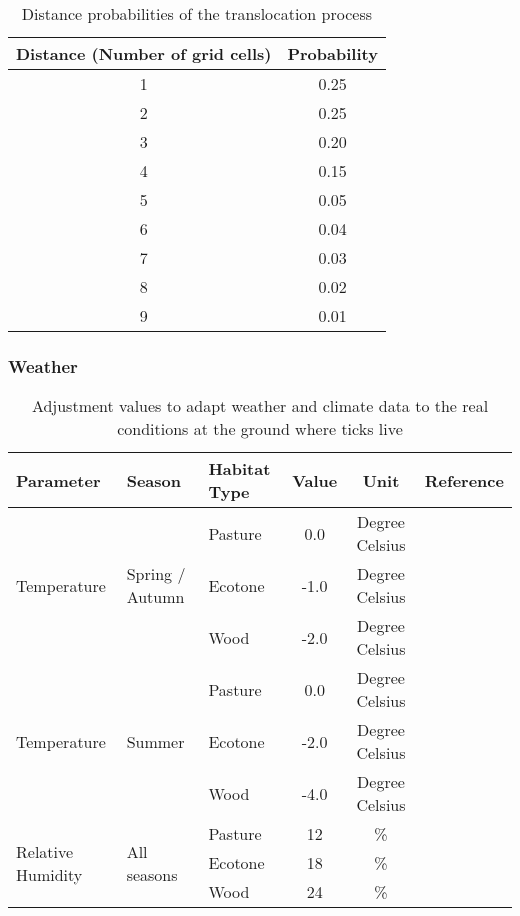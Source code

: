 \documentclass[a4paper, 11pt]{scrartcl}
\begin{document}
\begin{table}[h!]
\caption{Distance probabilities of the translocation process}
\label{tab:distance_probabilities}
\begin{tabular}{@{}cc@{}}
\toprule
\textbf{Distance (Number of grid cells)}	& \textbf{Probability}	\\
\midrule
1 	& 0.25 \\
2	& 0.25 \\
3	& 0.20 \\
4	& 0.15 \\
5	& 0.05 \\
6	& 0.04 \\
7	& 0.03 \\
8	& 0.02 \\
9	& 0.01 \\
\bottomrule
\end{tabular}
\end{table}


\subsubsection{Weather}

\begin{table}[h!]
\caption{Adjustment values to adapt weather and climate data to the real conditions at the ground where ticks live}
\label{tab:micro_climate_adjustments}
\begin{tabular}{@{}lllccl@{}}
\toprule
\textbf{Parameter}					& \textbf{Season} 					& \textbf{Habitat Type}  & \textbf{Value}  	& \textbf{Unit} & \textbf{Reference}  	\\
\midrule
\multirow{3}{*}{Temperature} 		& \multirow{3}{*}{Spring / Autumn}  & Pasture 				 &   0.0   			&   Degree Celsius	&            		    \\
									&									& Ecotone 				 &   -1.0 	  		&   Degree Celsius &	    				\\
									&					 				& Wood    				 &   -2.0   		&   Degree Celsius &	    				\\
\midrule
\multirow{3}{*}{Temperature} 		& \multirow{3}{*}{Summer}        	& Pasture 				 &   0.0    		&	Degree Celsius	&          				\\
									&				 	 				& Ecotone 				 &  -2.0    		&  	Degree Celsius	& ~\cite{Geiger.1995}  	\\
									&				 	 				& Wood	   				 &  -4.0    		&  	Degree Celsius	& ~\cite{Bonan.2016}   	\\
\midrule
\multirow{3}{*}{Relative Humidity}  & \multirow{3}{*}{All seasons}      & Pasture 				 &   12   			&  	\%			&            		    \\
									&				 					& Ecotone 				 &   18    			&   \%    		&					    \\
									&				 					& Wood    				 &   24    			&  	\%			& ~\cite{Boehnke.2017} 	\\
\bottomrule
\end{tabular}
\end{table}



\newpage
\printbibliography[heading = bibintoc, title = {Bibliography}]
\end{document}
